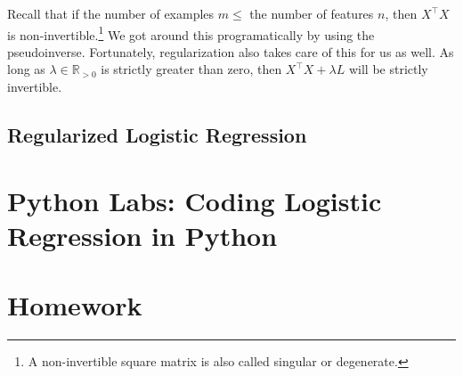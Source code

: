 Recall that if the number of examples $m \leq$ the number of features $n$, then $X^\intercal X$ is non-invertible.\footnote{A non-invertible square matrix is also called singular or degenerate.} We got around this programatically by using the pseudoinverse. Fortunately, regularization also takes care of this for us as well. As long as $\lambda \in \mathbb{R}_{>0}$ is strictly greater than zero, then $X^\intercal X + \lambda L$ will be strictly invertible. 


\subsection{Regularized Logistic Regression}





\section{Python Labs: Coding Logistic Regression in Python}
\section{Homework}





























